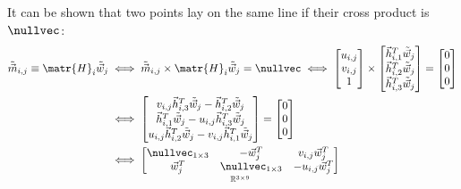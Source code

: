 \begin{description}
\begin{description}
                It can be shown that two points lay on the same line if their cross product is $\nullvec$:
                \begin{align*}
                    \tilde{\vec{m}}_{i,j} \equiv \matr{H}_i \tilde{\vec{w}}_j 
                    &\iff
                        \tilde{\vec{m}}_{i,j} \times \matr{H}_i \tilde{\vec{w}}_j = \nullvec \iff
                        \begin{bmatrix} u_{i, j} \\ v_{i, j} \\ 1 \end{bmatrix} \times
                        \begin{bmatrix}
                            \vec{h}_{i, 1}^T \tilde{\vec{w}}_j \\ 
                            \vec{h}_{i, 2}^T \tilde{\vec{w}}_j \\ 
                            \vec{h}_{i, 3}^T \tilde{\vec{w}}_j
                        \end{bmatrix} =
                        \begin{bmatrix} 0 \\ 0 \\ 0 \end{bmatrix} 
                    \\
                    &\iff
                        \begin{bmatrix}
                            v_{i,j} \vec{h}_{i,3}^T \tilde{\vec{w}}_j - \vec{h}_{i, 2}^T \tilde{\vec{w}}_j \\
                            \vec{h}_{i, 1}^T \tilde{\vec{w}}_j - u_{i, j} \vec{h}_{i, 3}^T \tilde{\vec{w}}_j \\
                            u_{i, j} \vec{h}_{i, 2}^T \tilde{\vec{w}}_j - v_{i, j} \vec{h}_{i, 1}^T \tilde{\vec{w}}_j
                        \end{bmatrix} =
                        \begin{bmatrix} 0 \\ 0 \\ 0 \end{bmatrix} 
                    \\
                    &\iff
                        \underset{\mathbb{R}^{3 \times 9}}{\begin{bmatrix}
                            \nullvec_{1\times 3} & -\vec{w}_j^T & v_{i,j}\vec{w}_j^T \\
                            \vec{w}_j^T & \nullvec_{1\times 3} & -u_{i,j} \vec{w}_j^T \\

\end{bmatrix}}
\end{align*}
\end{description}
\end{description}
